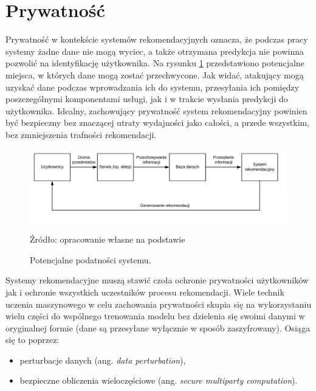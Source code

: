 \section{Prywatność}
Prywatność w kontekście systemów rekomendacyjnych oznacza, że podczas pracy systemy żadne dane nie mogą wyciec, a także otrzymana predykcja nie powinna pozwolić na identyfikację użytkownika. Na rysunku \ref{fig:podatnosci} przedstawiono potencjalne miejsca, w których dane mogą zostać przechwycone. Jak widać, atakujący mogą uzyskać dane podczas wprowadzania ich do systemu, przesyłania ich pomiędzy poszczególnymi komponentami usługi, jak i w trakcie wysłania predykcji do użytkownika. Idealny, zachowujący prywatność system rekomendacyjny powinien być bezpieczny bez znaczącej utraty wydajności jako całości, a przede wszystkim, bez zmniejszenia trafności rekomendacji.
\begin{figure}[H]
    \centering
    \includegraphics[scale=0.85]{images/podatnosci.png}
    \caption{Potencjalne podatności systemu.}    Źródło: opracowanie własne na podstawie \cite{practicalPrivacy}

    \label{fig:podatnosci}
\end{figure}
Systemy rekomendacyjne muszą stawić czoła ochronie prywatności użytkowników jak i ochronie wszystkich uczestników procesu rekomendacji. Wiele technik uczenia maszynowego w celu zachowania prywatności skupia się na wykorzystaniu wielu części do wspólnego trenowania modelu bez dzielenia się swoimi danymi w oryginalnej formie (dane są przesyłane wyłącznie w sposób zaszyfrowany). Osiąga się to poprzez:
\begin{itemize}
    \item perturbacje danych (ang. \textit{data perturbation}),
    \item bezpieczne obliczenia wieloczęściowe (ang. \textit{secure multiparty computation}).
\end{itemize}

